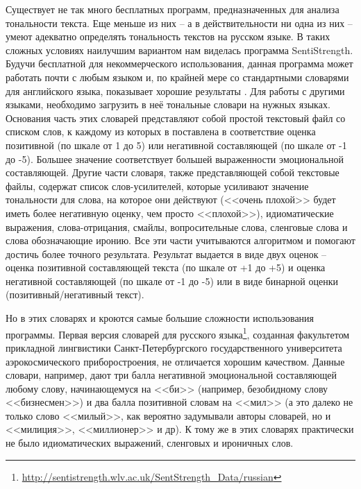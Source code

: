 Существует не так много бесплатных программ, предназначенных для анализа тональности текста. Еще меньше из них -- а в действительности ни одна из них -- умеют адекватно определять тональность текстов на русском языке. В таких сложных условиях наилучшим вариантом нам виделась программа SentiStrength. Будучи бесплатной для некоммерческого использования, данная программа может работать почти с любым языком и, по крайней мере со стандартными словарями для английского языка, показывает хорошие результаты \cite{SentiStrength}. Для работы с другими языками, необходимо загрузить в неё тональные словари на нужных языках. Основания часть этих словарей представляют собой простой текстовый файл со списком слов, к каждому из которых в поставлена в соответствие оценка позитивной (по шкале от 1 до 5) или негативной составляющей (по шкале от -1 до -5). Большее значение соответствует большей выраженности эмоциональной составляющей. Другие части словаря, также представляющей собой текстовые файлы, содержат список слов-усилителей, которые усиливают значение тональности для слова, на которое они действуют (<<очень плохой>> будет иметь более негативную оценку, чем просто <<плохой>>), идиоматические выражения, слова-отрицания, смайлы, вопросительные слова, сленговые слова и слова обозначающие иронию. Все эти части учитываются алгоритмом и помогают достичь более точного результата. Результат выдается в виде двух оценок – оценка позитивной составляющей текста (по шкале от +1 до +5) и оценка негативной составляющей (по шкале от -1 до -5) или в виде бинарной оценки (позитивный/негативный текст).

Но в этих словарях и кроются самые большие сложности использования программы. Первая версия словарей для русского языка\footnote{\href{http://sentistrength.wlv.ac.uk/SentStrength\_Data/russian}{http://sentistrength.wlv.ac.uk/SentStrength\_Data/russian}}, созданная факультетом прикладной лингвистики Санкт-Петербургского государственного университета аэрокосмического приборостроения, не отличается хорошим качеством. Данные словари, например, дают три балла негативной эмоциональной составляющей любому слову, начинающемуся на <<би>> (например, безобидному слову <<бизнесмен>>) и два балла позитивной словам на <<мил>> (а это далеко не только слово <<милый>>, как вероятно задумывали авторы словарей, но и <<милиция>>, <<миллионер>> и др). К тому же в этих словарях практически не было идиоматических выражений, сленговых и ироничных слов.

